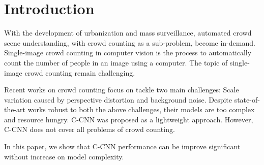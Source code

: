 \section{Introduction}

With the development of urbanization and mass surveillance, automated crowd scene understanding, with crowd counting as a sub-problem, become in-demand. Single-image crowd counting in computer vision is the process to automatically count the number of people in an image using a computer.  The topic of single-image crowd counting remain challenging.

Recent works on crowd counting focus on tackle two main challenges: Scale variation caused by perspective distortion and background noise. Despite state-of-the-art works robust to both the above challenges, their models are too complex and resource hungry. C-CNN \cite{9053780} was proposed as a lightweight approach. However, C-CNN does not cover all problems of crowd counting.

In this paper, we show that C-CNN performance can be improve significant without increase on model complexity. 





